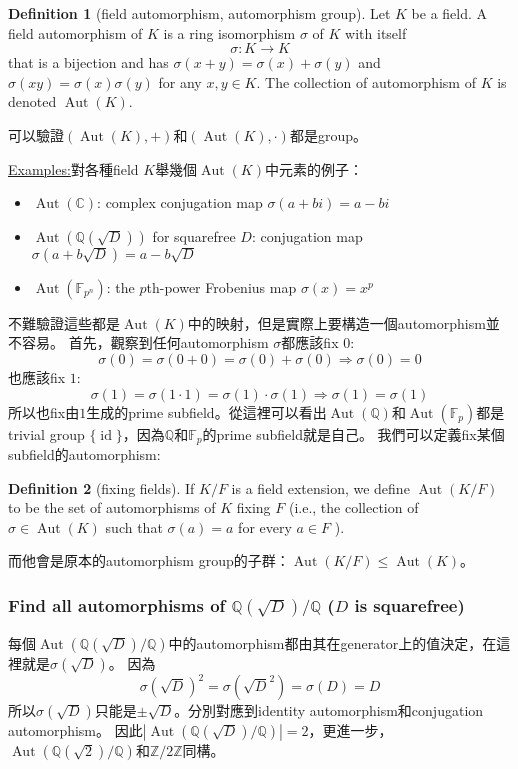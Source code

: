 \documentclass[12pt]{article}
\theoremstyle{definition}
\newcommand{\ex}{\noindent\underline{Examples:}}
\newtheorem{dfn}{Definition}
\newcommand{\CC}{\mathbb C}
\newcommand{\FF}{\mathbb F}
\newcommand{\QQ}{\mathbb Q}
\newcommand{\ZZ}{\mathbb Z}
\DeclareMathOperator{\Aut}{Aut}
\DeclareMathOperator{\id}{id}
\begin{document}
\begin{dfn}[field automorphism, automorphism group]
	Let $K$ be a field. A field automorphism of $K$ is a ring isomorphism $\sigma$ of $K$ with itself
	\[\sigma:K\to K\]
	that is a bijection and has $\sigma(x+y)=\sigma(x)+\sigma(y)$ and $\sigma(xy)=\sigma(x)\sigma(y)$ for any $x,y\in K$.
	The collection of automorphism of $K$ is denoted $\Aut(K)$.
\end{dfn}
可以驗證$(\Aut(K),+)$和$(\Aut(K),\cdot)$都是group。

\ex 對各種field $K$舉幾個$\Aut(K)$中元素的例子：

\begin{itemize}
	\item $\Aut(\CC)$: complex conjugation map $\sigma(a+bi)=a-bi$
	\item $\Aut(\QQ(\sqrt{D}))$ for squarefree $D$: conjugation map $\sigma(a+b\sqrt{D})=a-b\sqrt{D}$
	\item $\Aut(\FF_{p^n})$: the $p$th-power Frobenius map $\sigma(x)=x^p$
\end{itemize}

不難驗證這些都是$\Aut(K)$中的映射，但是實際上要構造一個automorphism並不容易。
首先，觀察到任何automorphism $\sigma$都應該fix $0$:
\[\sigma(0)=\sigma(0+0)=\sigma(0)+\sigma(0) \Rightarrow \sigma(0)=0\]
也應該fix $1$:
\[\sigma(1)=\sigma(1\cdot 1)=\sigma(1)\cdot\sigma(1) \Rightarrow \sigma(1)=\sigma(1)\]
所以也fix由$1$生成的prime subfield。從這裡可以看出$\Aut(\QQ)$和$\Aut(\FF_p)$都是
trivial group $\{\id\}$，因為$\QQ$和$\FF_p$的prime subfield就是自己。
我們可以定義fix某個subfield的automorphism:
\begin{dfn}[fixing fields]
	If $K/F$ is a field extension, we define $\Aut(K/F)$ to be the set of
	automorphisms of $K$ fixing $F$ (i.e., the collection of $\sigma\in \Aut(K)$
	such that $\sigma(a)=a$ for every $a\in F$ ).
\end{dfn}
而他會是原本的automorphism group的子群：$\Aut(K/F)\le \Aut(K)$。

\subsubsection*{Find all automorphisms of $\QQ(\sqrt{D})/\QQ$ ($D$ is squarefree)}
每個$\Aut(\QQ(\sqrt{D})/\QQ)$中的automorphism都由其在generator上的值決定，在這裡就是$\sigma(\sqrt{D})$。
因為
\[\sigma(\sqrt{D})^2=\sigma(\sqrt{D}^2)=\sigma(D)=D\]
所以$\sigma(\sqrt{D})$只能是$\pm\sqrt{D}$。分別對應到identity automorphism和conjugation automorphism。
因此$|\Aut(\QQ(\sqrt{D})/\QQ)|=2$，更進一步，$\Aut(\QQ(\sqrt{2})/\QQ)$和$\ZZ/2\ZZ$同構。
\end{document}

